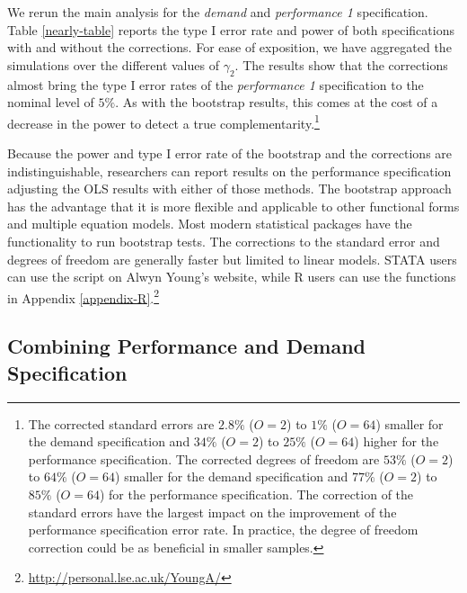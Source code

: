 \documentclass[12pt]{article}
\begin{document}
We rerun the main analysis for the \emph{demand} and \emph{performance 1} specification. Table \ref{nearly-table} reports the type I error rate and power of both specifications with and without the corrections. For ease of exposition, we have aggregated the simulations over the different values of $\gamma_2$. The results show that the corrections almost bring the type I error rates of the \emph{performance 1} specification to the nominal level of $5\%$. As with the bootstrap results, this comes at the cost of a decrease in the power to detect a true complementarity.\footnote{The corrected standard errors are $2.8\%$ ($O = 2$) to $1\%$ ($O = 64$) smaller for the demand specification and $34\%$ ($O = 2$) to $25\%$ ($O = 64$) higher for the performance specification. The corrected degrees of freedom are $53\%$ ($O = 2$) to $64\%$ ($O = 64$) smaller for the demand specification and $77\%$ ($O = 2$) to $85\%$ ($O = 64$) for the performance specification. The correction of the standard errors have the largest impact on the improvement of the performance specification error rate. In practice, the degree of freedom correction could be as beneficial in smaller samples.}



Because the power and type I error rate of the bootstrap and the \citet{young_improved_2016} corrections are indistinguishable, researchers can report results on the performance specification adjusting the OLS results with either of those methods. The bootstrap approach has the advantage that it is more flexible and applicable to other functional forms and multiple equation models. Most modern statistical packages have the functionality to run bootstrap tests. The corrections to the standard error and degrees of freedom are generally faster but limited to linear models. STATA users can use the script on Alwyn Young's website, while R users can use the functions in Appendix \ref{appendix-R}.\footnote{\url{http://personal.lse.ac.uk/YoungA/}}

\subsection{Combining Performance and Demand Specification}
\end{document}
